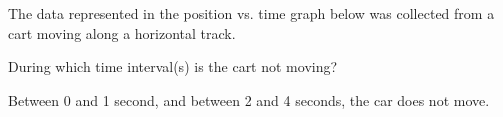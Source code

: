 \documentclass[answers]{exam}
\begin{document}
\begin{questions}



\question
The data represented in the position vs. time graph below was collected from a cart moving along a horizontal track.

\begin{center}
\end{center}

During which time interval(s) is the cart not moving?

\ifprintanswers
\else
\fillwithlines{1cm}
\fi

\begin{solution}
    Between 0 and 1 second, and between 2 and 4 seconds, the car does not move.
\end{solution}



\end{questions}
\end{document}
